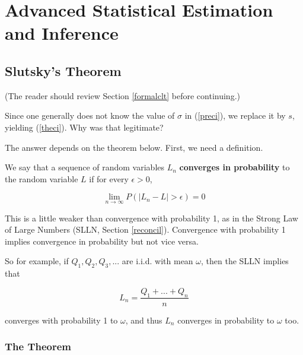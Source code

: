 \chapter{Advanced Statistical Estimation and Inference}
\label{chap:estadv} 

\section{Slutsky's Theorem}
\label{slutsky}

(The reader should review Section \ref{formalclt} before continuing.)

Since one generally does not know the value of $\sigma$ in
(\ref{preci}), we replace it by $s$, yielding (\ref{theci}).  Why was
that legitimate?  

The answer depends on the theorem below.  First, we need a definition.

\begin{definition}
We say that a sequence of random variables $L_n$ {\bf converges in
probability} to the random variable $L$ if for every $\epsilon > 0$,

\begin{equation}
\lim_{{n} \rightarrow \infty} P(|L_n -L| > \epsilon)  = 0
\end{equation}

\end{definition}

This is a little weaker than convergence with probability 1, as in the
Strong Law of Large Numbers (SLLN, Section \ref{reconcil}).  Convergence
with probability 1 implies convergence in probability but not vice
versa.

So for example, if $Q_1, Q_2, Q_3,...$ are i.i.d. with mean $\omega$,
then the SLLN implies that

\begin{equation}
L_n = \frac{Q_1+...+Q_n}{n}
\end{equation}

converges with probability 1 to $\omega$, and thus $L_n$ converges in
probability to $\omega$ too.

\subsection{The Theorem}

